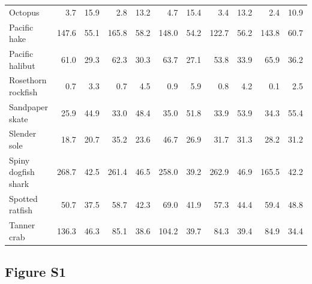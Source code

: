 \documentclass[]{article}
\begin{document}
\begin{table}[!h]
\begin{tabular}{lrrrrrrrrrr}
Octopus & 3.7 & 15.9 & 2.8 & 13.2 & 4.7 & 15.4 & 3.4 & 13.2 & 2.4 & 10.9\\
Pacific hake & 147.6 & 55.1 & 165.8 & 58.2 & 148.0 & 54.2 & 122.7 & 56.2 & 143.8 & 60.7\\
Pacific halibut & 61.0 & 29.3 & 62.3 & 30.3 & 63.7 & 27.1 & 53.8 & 33.9 & 65.9 & 36.2\\
Rosethorn rockfish & 0.7 & 3.3 & 0.7 & 4.5 & 0.9 & 5.9 & 0.8 & 4.2 & 0.1 & 2.5\\
\addlinespace
Sandpaper skate & 25.9 & 44.9 & 33.0 & 48.4 & 35.0 & 51.8 & 33.9 & 53.9 & 34.3 & 55.4\\
Slender sole & 18.7 & 20.7 & 35.2 & 23.6 & 46.7 & 26.9 & 31.7 & 31.3 & 28.2 & 31.2\\
Spiny dogfish shark & 268.7 & 42.5 & 261.4 & 46.5 & 258.0 & 39.2 & 262.9 & 46.9 & 165.5 & 42.2\\
Spotted ratfish & 50.7 & 37.5 & 58.7 & 42.3 & 69.0 & 41.9 & 57.3 & 44.4 & 59.4 & 48.8\\
Tanner crab & 136.3 & 46.3 & 85.1 & 38.6 & 104.2 & 39.7 & 84.3 & 39.4 & 84.9 & 34.4\\
\bottomrule
\end{tabular}
\end{table}

\pagebreak

\subsection{Figure S1}\label{figure-s1}
\end{document}
